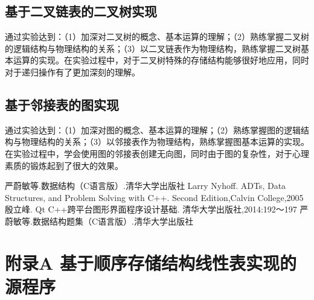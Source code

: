 \documentclass[supercite]{Experimental_Report}
\theoremstyle{definition}
\begin{document}
\subsection{基于二叉链表的二叉树实现}

通过实验达到：（1）加深对二叉树的概念、基本运算的理解；（2）熟练掌握二叉树的逻辑结构与物理结构的关系；（3）以二叉链表作为物理结构，熟练掌握二叉树基本运算的实现。在实验过程中，对于二叉树特殊的存储结构能够很好地应用，同时对于递归操作有了更加深刻的理解。

\subsection{基于邻接表的图实现}

通过实验达到：（1）加深对图的概念、基本运算的理解；（2）熟练掌握图的逻辑结构与物理结构的关系；（3）以邻接表作为物理结构，熟练掌握图基本运算的实现。在实验过程中，学会使用图的邻接表创建无向图，同时由于图的复杂性，对于心理素质的锻炼起到了很大的效果。

\nocite{*} %

\begin{thebibliography}{}
严蔚敏等.数据结构（C语言版）.清华大学出版社
Larry Nyhoff. ADTs, Data Structures, and Problem Solving with C++.  Second Edition,Calvin College,2005
殷立峰. Qt C++跨平台图形界面程序设计基础. 清华大学出版社,2014:192～197
严蔚敏等.数据结构题集（C语言版）.清华大学出版社
\end{thebibliography}

\section{附录A 基于顺序存储结构线性表实现的源程序}
\end{document}
